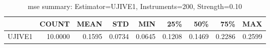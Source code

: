 \begin{table}[ht]
\centering
\caption{mse summary: Estimator=UJIVE1, Instruments=200, Strength=0.10}
\begin{tabular}{lrrrrrrrr}
\toprule
 & COUNT & MEAN & STD & MIN & 25\% & 50\% & 75\% & MAX \\
\midrule
UJIVE1 & 10.0000 & 0.1595 & 0.0734 & 0.0645 & 0.1208 & 0.1469 & 0.2286 & 0.2599 \\
\bottomrule
\end{tabular}
\end{table}
